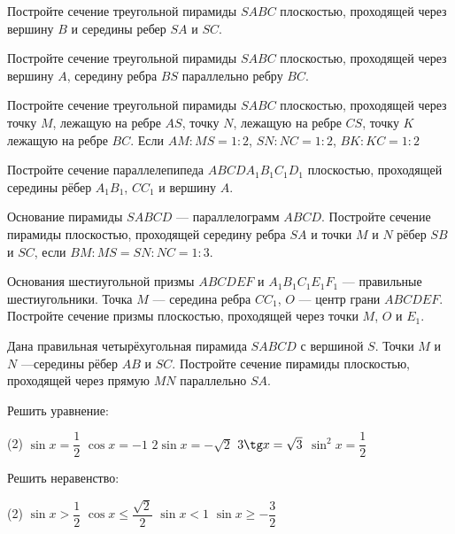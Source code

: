 \begin{consultation}
	\begin{listofex}
		\item Постройте сечение треугольной пирамиды \(SABC\) плоскостью, проходящей через вершину \(B\) и середины ребер \(SA\) и \(SC\).
		\item Постройте сечение треугольной пирамиды \(SABC\) плоскостью, проходящей через вершину \(A\), середину ребра \(BS\) параллельно ребру \(BC\).
		\item  Постройте сечение треугольной пирамиды \(SABC\) плоскостью, проходящей через точку \(M\), лежащую на ребре \(AS\), точку \(N\), лежащую на ребре \(CS\), точку \(K\) лежащую на ребре \(BC\). Если \(AM:MS=1:2\), \(SN:NC=1:2\), \(BK:KC=1:2\)
		\item  Постройте сечение параллелепипеда \(ABCDA_1B_1C_1D_1\) плоскостью, проходящей середины рёбер \(A_1B_1\), \(CC_1\) и вершину \(A\).
		\item Основание пирамиды \(SABCD\) — параллелограмм \(ABCD\). Постройте сечение пирамиды плоскостью, проходящей середину ребра \(SA\) и точки \(M\) и \(N\) рёбер \(SB\) и \(SC\), если \(BM:MS=SN:NC =1:3\).
		\item  Основания шестиугольной призмы \(ABCDEF\) и \(A_1B_1C_1E_1F_1\) --- правильные шестиугольники. Точка \(M\) --- середина ребра \(CC_1\), \(O\) --- центр грани \(ABCDEF\). Постройте сечение призмы плоскостью, проходящей через точки \(M\), \(O\) и \(E_1\).
		\item  Дана правильная четырёхугольная пирамида \(SABCD\) с вершиной \(S\). Точки \(M\) и \(N\) —середины рёбер \(AB\) и \(SC\). Постройте сечение пирамиды плоскостью, проходящей через прямую \(MN\) параллельно \(SA\).
		\newpage
		
		\item Решить уравнение:
		\begin{tasks}(2)
			\task \( \sin x = \dfrac{1}{2} \)
			\task \( \cos x = -1 \)
			\task \( 2\sin x = -\sqrt{2} \)
			\task \( 3\tg x = \sqrt{3} \)
			\task \( \sin^2 x = \dfrac{1}{2} \)
		\end{tasks}
		\item Решить неравенство:
		\begin{tasks}(2)
			\task \( \sin x > \dfrac{1}{2} \)
			\task \( \cos x \le \dfrac{\sqrt{2}}{2} \)
			\task \( \sin x < 1 \)
			\task \( \sin x \ge -\dfrac{3}{2}\)
		\end{tasks}
	\end{listofex}
\end{consultation}

